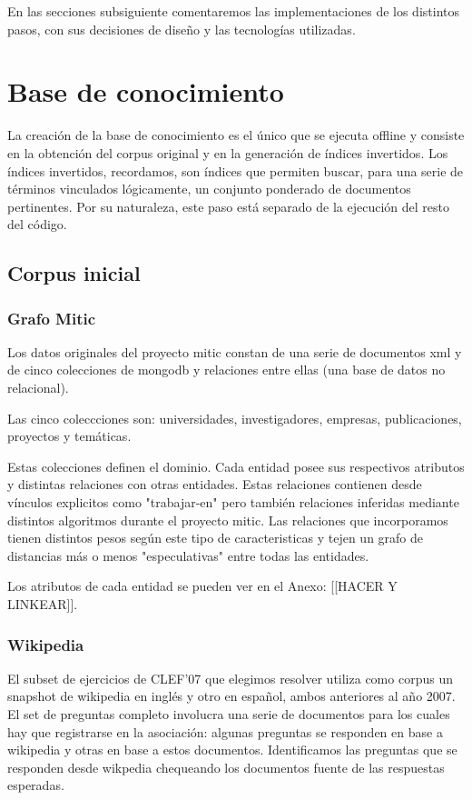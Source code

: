 En las secciones subsiguiente comentaremos las implementaciones de los
distintos pasos, con sus decisiones de dise\~no y las tecnologías
utilizadas. 


\bigskip

\section{Base de conocimiento}
\bigskip


La creación de la base de conocimiento es el único que se ejecuta offline
y consiste en la obtención del corpus original y en la generación de índices
invertidos. Los índices invertidos, recordamos, son índices que permiten
buscar, para una serie de términos vinculados lógicamente, un conjunto
ponderado de documentos pertinentes. Por su naturaleza, este paso está 
separado de la ejecución del resto del código.

\subsection{Corpus inicial}

\subsubsection{Grafo Mitic}
Los datos originales del proyecto mitic constan de una serie de documentos 
xml y de cinco colecciones de mongodb y relaciones entre ellas (una base de datos no relacional).

Las cinco coleccciones son: universidades, investigadores, empresas,
publicaciones, proyectos y temáticas.

Estas colecciones definen el dominio. Cada entidad 
posee sus respectivos atributos y distintas relaciones con otras entidades.
Estas relaciones contienen desde vínculos explicitos como "trabajar-en"
pero también relaciones inferidas mediante distintos algoritmos durante el proyecto mitic.
Las relaciones que incorporamos tienen distintos pesos según este tipo de caracteristicas
y tejen un grafo de distancias más o menos "especulativas" entre todas las entidades.

Los atributos de cada entidad se pueden ver en el Anexo: [[HACER Y LINKEAR]].

\subsubsection{Wikipedia}
El subset de ejercicios de CLEF'07 que elegimos resolver
utiliza como corpus un snapshot de wikipedia en inglés y otro en español,
ambos anteriores al año 2007.
El set de preguntas completo involucra una serie de documentos para los cuales hay que 
registrarse en la asociación: algunas preguntas se responden en base a wikipedia y otras en base a estos documentos.
Identificamos las preguntas que se responden desde wikpedia chequeando los documentos fuente de las respuestas esperadas.

